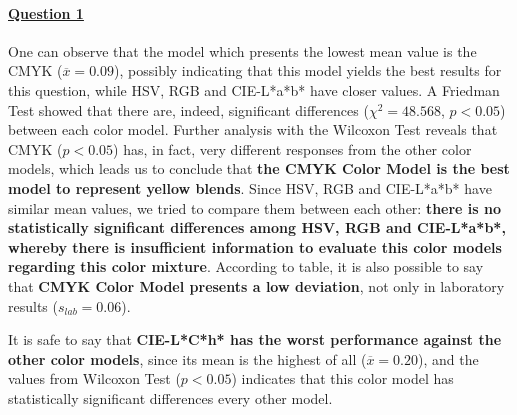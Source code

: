 \paragraph{\ul{Question 1}}
%
One can observe that the model which presents the lowest mean value is the CMYK ($\overline{x} = 0.09$), possibly indicating that this model yields
the best results for this question, while HSV, RGB and CIE-L*a*b* have closer values. A Friedman Test showed that there are, indeed, significant
differences ($\chi^2 = 48.568$, $p < 0.05$) between each color model.
Further analysis with the Wilcoxon Test reveals that CMYK ($p < 0.05$) has, in fact, very different responses from the other color models, which leads
us to conclude that \textbf{the CMYK Color Model is the best model to represent yellow blends}. Since HSV, RGB and CIE-L*a*b* have similar mean values,
we tried to compare them between each other: \textbf{there is no statistically significant differences among HSV, RGB and CIE-L*a*b*, whereby there is insufficient
information to evaluate this color models regarding this color mixture}. According to table, it is also possible to say that \textbf{CMYK Color Model
presents a low deviation}, not only in laboratory results ($s_{lab} = 0.06$). \par
%
It is safe to say that \textbf{CIE-L*C*h* has the worst performance against the other color models}, since its mean is the highest of all
($\overline{x} = 0.20$), and the values from Wilcoxon Test ($p < 0.05$) indicates that this color model has statistically significant differences every
other model.
%
